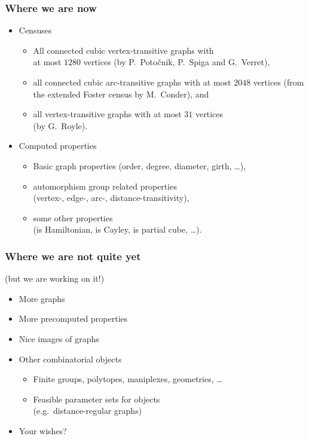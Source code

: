 \documentclass[usepdftitle=false]{beamer}
\newcommand{\defn}[1]{\textcolor{zoored}{\emph{#1}}}
\newcommand{\keyw}[1]{\textcolor{zooteal}{#1}}
\newcommand{\con}[1]{\textcolor{zoored}{#1}}
\begin{document}
\frame
{
    \frametitle{Where we are now}

    \begin{itemize}
    \itemsep=5mm
    \item \con{Censuses}
        \begin{itemize}
        \itemsep=3mm
        \item All connected \keyw{cubic vertex-transitive} graphs with \\
        at most \defn{$1280$} vertices (by P.~Potočnik, P.~Spiga and G.~Verret),
        \item all connected \keyw{cubic arc-transitive} graphs with at most
        \defn{$2048$} vertices (from the extended Foster census by M.~Conder),
        and
        \item all \keyw{vertex-transitive graphs} with at most \defn{$31$}
        vertices \\ (by G.~Royle).
        \end{itemize}
    \item \con{Computed properties}
        \begin{itemize}
        \itemsep=3mm
        \item Basic graph properties (\keyw{order}, \keyw{degree},
        \keyw{diameter}, \keyw{girth}, \dots),
        \item automorphism group related properties \\
        (\keyw{vertex-}, \keyw{edge-}, \keyw{arc-},
        \keyw{distance-transitivity}),
        \item some other properties \\
        (\keyw{is Hamiltonian}, \keyw{is Cayley}, \keyw{is partial cube},
        \dots).
        \end{itemize}
    \end{itemize}
}

\frame
{
    \frametitle{Where we are not quite yet}
    (but we are working on it!)
    \vskip 1cm

    \begin{itemize}
    \itemsep=5mm
    \item More graphs
    \item More precomputed properties
    \item Nice \keyw{images} of graphs
    \item Other combinatorial objects
        \begin{itemize}
        \itemsep=3mm
        \item \keyw{Finite groups}, \keyw{polytopes}, \keyw{maniplexes},
        \keyw{geometries}, \dots
        \item Feasible \keyw{parameter sets} for objects \\
        (e.g.~distance-regular graphs)
        \end{itemize}
    \item \con{Your wishes?}
    \end{itemize}
    \vskip 1cm
}
\end{document}
